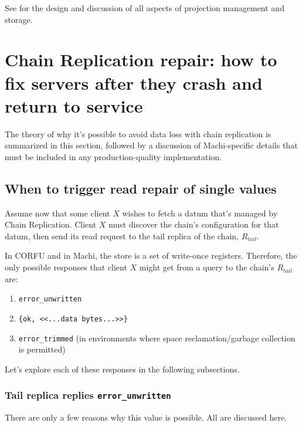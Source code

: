\documentclass[preprint,10pt]{sigplanconf}
\begin{document}
See \cite{machi-chain-manager-design} for the design and discussion of
all aspects of projection management and storage.

\section{Chain Replication repair: how to fix servers after they crash
and return to service}
\label{sec:repair}

The theory of why it's possible to avoid
data loss with chain replication is summarized in this section,
followed by a discussion of Machi-specific details that must be
included in any production-quality implementation.

\subsection{When to trigger read repair of single values}

Assume now that some client $X$ wishes to fetch a datum that's managed
by Chain Replication.  Client $X$ must discover the chain's
configuration for that datum, then send its read request to the tail
replica of the chain, $R_{tail}$.

In CORFU and in Machi, the store is a set of write-once registers.
Therefore, the only possible responses that client $X$ might get from a
query to the chain's $R_{tail}$ are:

\begin{enumerate}
\item {\tt error\_unwritten}
\item {\tt \{ok, <<...data bytes...>>\}}
\item {\tt error\_trimmed} (in environments where space
  reclamation/garbage collection is permitted)
\end{enumerate}

Let's explore each of these responses in the following subsections.

\subsubsection{Tail replica replies {\tt error\_unwritten}}

There are only a few reasons why this value is possible.  All are
discussed here.
\end{document}
